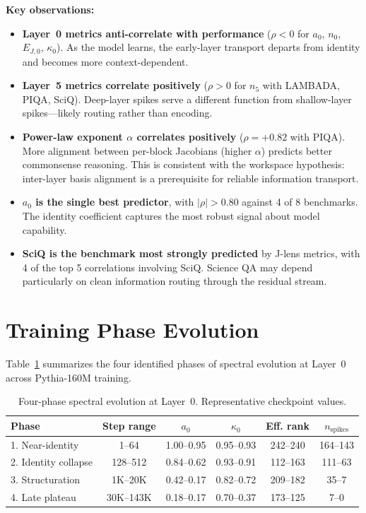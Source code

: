 \documentclass[11pt,a4paper]{article}
\begin{document}
\noindent\textbf{Key observations:}
\begin{itemize}
  \item \textbf{Layer~0 metrics anti-correlate with performance} ($\rho < 0$ for $a_0$, $n_0$, $E_{J,0}$, $\kappa_0$). As the model learns, the early-layer transport departs from identity and becomes more context-dependent.
  \item \textbf{Layer~5 metrics correlate positively} ($\rho > 0$ for $n_5$ with LAMBADA, PIQA, SciQ). Deep-layer spikes serve a different function from shallow-layer spikes---likely routing rather than encoding.
  \item \textbf{Power-law exponent $\alpha$ correlates positively} ($\rho = +0.82$ with PIQA). More alignment between per-block Jacobians (higher $\alpha$) predicts better commonsense reasoning. This is consistent with the workspace hypothesis: inter-layer basis alignment is a prerequisite for reliable information transport.
  \item \textbf{$a_0$ is the single best predictor}, with $|\rho| > 0.80$ against 4 of 8 benchmarks. The identity coefficient captures the most robust signal about model capability.
  \item \textbf{SciQ is the benchmark most strongly predicted} by J-lens metrics, with 4 of the top 5 correlations involving SciQ. Science QA may depend particularly on clean information routing through the residual stream.
\end{itemize}

\section{Training Phase Evolution}

Table~\ref{tab:phases} summarizes the four identified phases of spectral evolution at Layer~0 across Pythia-160M training.

\begin{table}[H]
\centering
\caption{Four-phase spectral evolution at Layer~0. Representative checkpoint values.}
\label{tab:phases}
\begin{tabular}{lccccc}
\toprule
Phase & Step range & $a_0$ & $\kappa_0$ & Eff. rank & $n_{\text{spikes}}$ \\
\midrule
1. Near-identity      & 1--64     & 1.00--0.95 & 0.95--0.93 & 242--240 & 164--143 \\
2. Identity collapse  & 128--512  & 0.84--0.62 & 0.93--0.91 & 112--163 & 111--63  \\
3. Structuration      & 1K--20K   & 0.42--0.17 & 0.82--0.72 & 209--182 & 35--7    \\
4. Late plateau       & 30K--143K & 0.18--0.17 & 0.70--0.37 & 173--125 & 7--0     \\
\bottomrule
\end{tabular}
\end{table}
\end{document}
